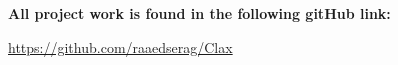 \textbf{All project work is found in the following gitHub link:}

\url{https://github.com/raaedserag/Clax}
